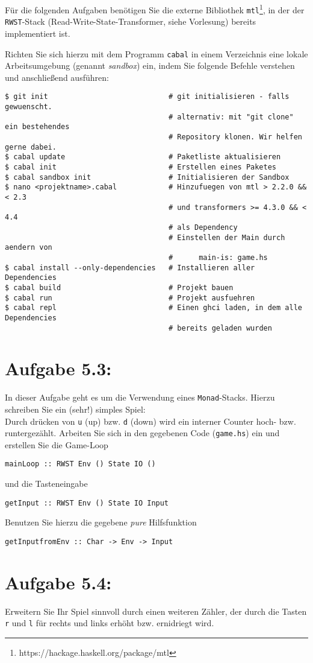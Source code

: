 \documentclass[a4paper,10pt]{scrartcl}
\newcommand{\theuebungszettel}{5}
\begin{document}
Für die folgenden Aufgaben benötigen Sie die externe Bibliothek \texttt{mtl}\footnote{https://hackage.haskell.org/package/mtl}, in der der \texttt{RWST}-Stack (Read-Write-State-Transformer, siehe Vorlesung) bereits implementiert ist.\bigskip

Richten Sie sich hierzu mit dem Programm \texttt{cabal} in einem Verzeichnis eine lokale Arbeitsumgebung (genannt \emph{sandbox}) ein, indem Sie folgende Befehle verstehen und anschließend ausführen:
\begin{verbatim}
$ git init                            # git initialisieren - falls gewuenscht.
                                      # alternativ: mit "git clone" ein bestehendes
                                      # Repository klonen. Wir helfen gerne dabei.
$ cabal update                        # Paketliste aktualisieren
$ cabal init                          # Erstellen eines Paketes
$ cabal sandbox init                  # Initialisieren der Sandbox
$ nano <projektname>.cabal            # Hinzufuegen von mtl > 2.2.0 && < 2.3
                                      # und transformers >= 4.3.0 && < 4.4
                                      # als Dependency
                                      # Einstellen der Main durch aendern von
                                      #      main-is: game.hs
$ cabal install --only-dependencies   # Installieren aller Dependencies
$ cabal build                         # Projekt bauen
$ cabal run                           # Projekt ausfuehren
$ cabal repl                          # Einen ghci laden, in dem alle Dependencies
                                      # bereits geladen wurden
\end{verbatim}

\section*{Aufgabe \theuebungszettel.3:}
In dieser Aufgabe geht es um die Verwendung eines \texttt{Monad}-Stacks. Hierzu schreiben Sie ein (sehr!) simples Spiel:\\
Durch drücken von \texttt{u} (up) bzw. \texttt{d} (down) wird ein interner Counter hoch- bzw. runtergezählt. Arbeiten Sie sich in den gegebenen Code (\texttt{game.hs}) ein und erstellen Sie die Game-Loop
\begin{verbatim}
mainLoop :: RWST Env () State IO ()
\end{verbatim}
und die Tasteneingabe
\begin{verbatim}
getInput :: RWST Env () State IO Input
\end{verbatim}
Benutzen Sie hierzu die gegebene \emph{pure} Hilfsfunktion
\begin{verbatim}
getInputfromEnv :: Char -> Env -> Input
\end{verbatim}
\section*{Aufgabe \theuebungszettel.4:}
Erweitern Sie Ihr Spiel sinnvoll durch einen weiteren Zähler, der durch die Tasten \texttt{r} und \texttt{l} für rechts und links erhöht bzw. ernidriegt wird.
\end{document}
